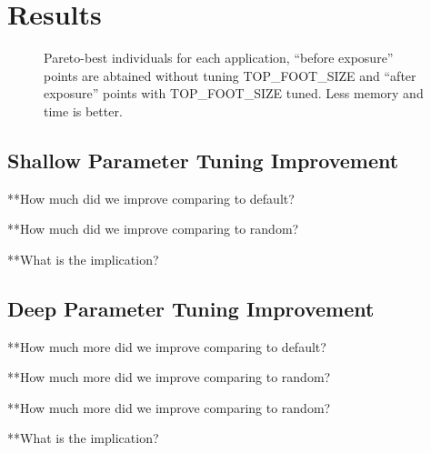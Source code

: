 
\section{Results}
\begin{figure*}[htbp]
	\centering
	\caption{Pareto-best individuals for each application, ``before exposure'' points are abtained without tuning TOP\_FOOT\_SIZE and ``after exposure'' points with TOP\_FOOT\_SIZE tuned. Less memory and time is better.}\label{fig_10}
\end{figure*}


\subsection{Shallow Parameter Tuning Improvement}

**How much did we improve comparing to default?

**How much did we improve comparing to random?

**What is the implication?


\subsection{Deep Parameter Tuning Improvement}


**How much more did we improve comparing to default?

**How much more did we improve comparing to random?

**How much more did we improve comparing to random?

**What is the implication?


